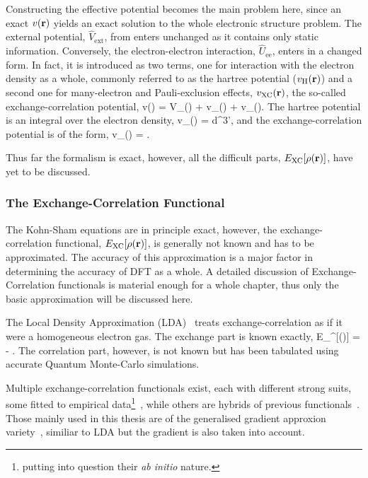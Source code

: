 Constructing the effective potential becomes the main problem here, since an exact $v({\mathrm{\mathbf{\bm{r}}}})$ yields an exact solution to the whole electronic structure problem.
The external potential, $\widehat{V}_\text{ext}$, from  enters unchanged as it contains only static information.
Conversely, the electron-electron interaction, $\widehat{U}_\text{ee}$, enters in a changed form.
In fact, it is introduced as two terms, one for interaction with the electron density as a whole, commonly referred to as the hartree potential ($v_\text{H}({\mathrm{\mathbf{\bm{r}}}})$) and a second one for many-electron and Pauli-exclusion effects, %
$v_\text{XC}({\mathrm{\mathbf{\bm{r}}}})$, the so-called exchange-correlation potential,
v(\vr) = V_(\vr) + v_(\vr) + v_(\vr).
\eeq
The hartree potential is an integral over the electron density,
v_(\vr) = \int {}d^3\vr',
\eeq
and the exchange-correlation potential is of the form,
v_(\vr) = .
\eeq

Thus far the formalism is exact, however, all the difficult parts, $E_\text{XC}[\rho({\mathrm{\mathbf{\bm{r}}}})]$, have yet to be discussed.

\subsubsection{The Exchange-Correlation Functional}
The Kohn-Sham equations are in principle exact, however, the exchange-correlation functional, $E_\text{XC}[\rho({\mathrm{\mathbf{\bm{r}}}})]$, is generally not known and has to be approximated.
The accuracy of this approximation is a major factor in determining the accuracy of DFT as a whole.
A detailed discussion of Exchange-Correlation functionals is material enough for a whole chapter, thus only the basic approximation will be discussed here.

The Local Density Approximation (LDA)~\cite{kohn-sham-1965} treats exchange-correlation as if it were a homogeneous electron gas.
The exchange part is known exactly,
E_^[\rho(\vr)] = -   \int {}.
\eeq
The correlation part, however, is not known but has been tabulated using accurate Quantum Monte-Carlo simulations.~\citemiss

Multiple exchange-correlation functionals exist, each with different strong suits, some fitted to empirical data\footnote{putting into question their \textit{ab initio} nature.}~\citemiss, while others are hybrids of previous functionals~\citemiss.
Those mainly used in this thesis are of the generalised gradient approxion variety~\citemiss, similiar to LDA but the gradient is also taken into account.

